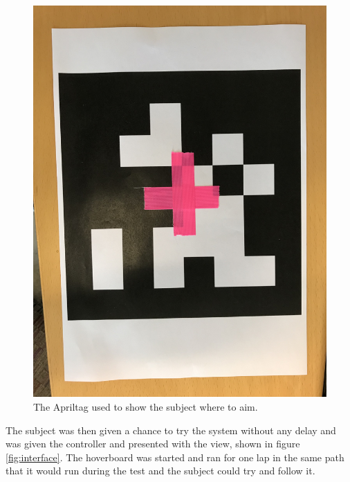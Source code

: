\documentclass[nofilelist]{cslthse-msc}
\begin{document}
\begin{figure}[!hbt]
   \centering
   \includegraphics[scale=0.08]{images/apriltag.jpg} 
   \caption{The Apriltag used to show the subject where to aim.}
   \label{fig:apriltag}
\end{figure}

The subject was then given a chance to try the system without any delay and was given the controller and presented with the view, shown in figure \ref{fig:interface}. The hoverboard was started and ran for one lap in the same path that it would run during the test and the subject could try and follow it.
\end{document}
